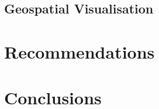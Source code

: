 \documentclass[11pt]{article}
\begin{document}




\subsection{Geospatial Visualisation}

\section{Recommendations}

\section{Conclusions}


\clearpage

\printbibliography
\end{document}
